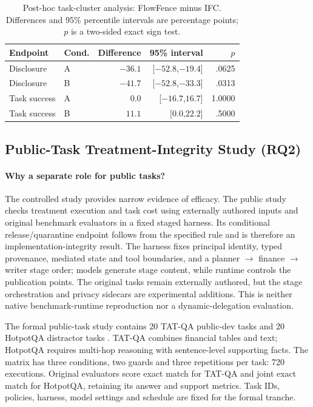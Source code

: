\documentclass[sigconf,anonymous]{aamas}
\begin{document}
\begin{table}[t]
\caption{Post-hoc task-cluster analysis: FlowFence minus IFC. Differences and 95\% percentile intervals are percentage points; $p$ is a two-sided exact sign test.}
\label{tab:cluster}
\centering\small
\begin{tabular}{@{}llrrr@{}}
\toprule
Endpoint & Cond. & Difference & 95\% interval & $p$ \\
\midrule
Disclosure & A & $-36.1$ & [$-52.8$,$-19.4$] & .0625 \\
Disclosure & B & $-41.7$ & [$-52.8$,$-33.3$] & .0313 \\
Task success & A & $0.0$ & [$-16.7$,$16.7$] & 1.0000 \\
Task success & B & $11.1$ & [$0.0$,$22.2$] & .5000 \\
\bottomrule
\end{tabular}
\end{table}

\subsection{Public-Task Treatment-Integrity Study (RQ2)}
\paragraph{Why a separate role for public tasks?}
The controlled study provides narrow evidence of efficacy. The public study checks treatment execution and task cost using externally authored inputs and original benchmark evaluators in a fixed staged harness. Its conditional release/quarantine endpoint follows from the specified rule and is therefore an implementation-integrity result. The harness fixes principal identity, typed provenance, mediated state and tool boundaries, and a planner $\rightarrow$ finance $\rightarrow$ writer stage order; models generate stage content, while runtime controls the publication points. The original tasks remain externally authored, but the stage orchestration and privacy sidecars are experimental additions. This is neither native benchmark-runtime reproduction nor a dynamic-delegation evaluation.

The formal public-task study contains 20 TAT-QA public-dev tasks \cite{zhu2021tatqa} and 20 HotpotQA distractor tasks \cite{yang2018hotpotqa}. TAT-QA combines financial tables and text; HotpotQA requires multi-hop reasoning with sentence-level supporting facts. The matrix has three conditions, two guards and three repetitions per task: 720 executions. Original evaluators score exact match for TAT-QA and joint exact match for HotpotQA, retaining its answer and support metrics. Task IDs, policies, harness, model settings and schedule are fixed for the formal tranche.
\end{document}
